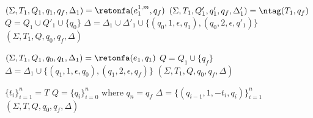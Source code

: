 \documentclass[]{article}
\let\oldnl\nl%
\newcommand{\nonl}{\renewcommand{\nl}{\let\nl\oldnl}}%
\begin{document}
\begin{algorithm}[]
\begin{multicols}{2}
{     {
        $(\Sigma, T_1, Q_1, q_1, q_f, \Delta_1) = \retonfa (e_1^{1, m}, q_f)$ \;
        $(\Sigma, T_1, Q'_1, q'_1, q_f, \Delta'_1) = \ntag (T_1, q_f)$ \;
        $Q = Q_1 \cup Q'_1 \cup \{q_0\}$ \;
        $\Delta = \Delta_1 \cup \Delta'_1 \cup \{ (q_0, 1, \epsilon, q_1), (q_0, 2, \epsilon, q'_1) \}$ \;
        \Return $(\Sigma, T_1, Q, q_0, q_f, \Delta)$
    }
    \BlankLine
    \BlankLine

     {
        $(\Sigma, T_1, Q_1, q_0, q_1, \Delta_1) = \retonfa (e_1, q_1)$ \;
        $Q = Q_1 \cup \{q_f\}$ \;
        $\Delta = \Delta_1 \cup \{ (q_1, 1, \epsilon, q_0), (q_1, 2, \epsilon, q_f) \}$ \;
        \Return $(\Sigma, T_1, Q, q_0, q_f, \Delta)$
    }
    }
    \vspace{2em}

    \nonl{} {
        \Indp
        $\{ t_i \}_{i=1}^n = T$ \;
        $Q = \{q_i\}_{i=0}^n$ where $q_n = q_f$ \;
        $\Delta = \{ (q_{i-1}, 1, -t_i, q_i) \}_{i=1}^n$ \;
        \Return $(\Sigma, T, Q, q_0, q_f, \Delta)$ \;
    }

    \vfill\null

\columnbreak


\end{multicols}
\end{algorithm}
\end{document}
